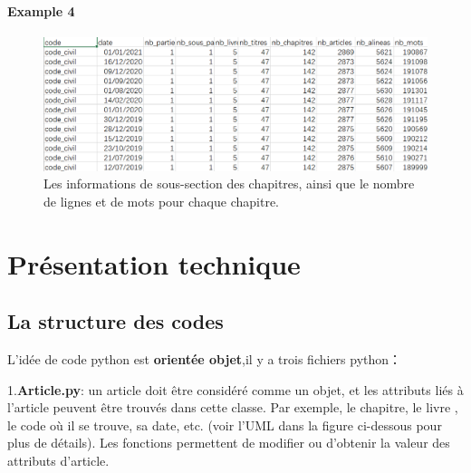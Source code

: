 \documentclass[
  oneside]{book}
\begin{document}
\hypertarget{example-4}{%
\paragraph{Example 4}\label{example-4}}

\begin{figure}

{\centering \includegraphics[width=0.8\linewidth]{images/stats6} 

}

\caption{Les informations de sous-section des chapitres, ainsi que le nombre de lignes et de mots pour chaque chapitre.}\label{fig:stats6}
\end{figure}

\hypertarget{pruxe9sentation-technique}{%
\section{Présentation technique}\label{pruxe9sentation-technique}}

\hypertarget{la-structure-des-codes}{%
\subsection{La structure des codes}\label{la-structure-des-codes}}

L'idée de code python est \textbf{orientée objet},il y a trois fichiers python：

1.\textbf{Article.py}: un article doit être considéré comme un objet, et les attributs liés à l'article peuvent être trouvés dans cette classe. Par exemple, le chapitre, le livre , le code où il se trouve, sa date, etc. (voir l'UML dans la figure ci-dessous pour plus de détails).
Les fonctions permettent de modifier ou d'obtenir la valeur des attributs d'article.
\end{document}
